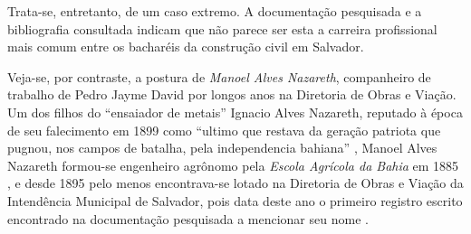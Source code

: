 Trata-se, entretanto, de um caso extremo. A documentação pesquisada e a bibliografia consultada indicam que não parece ser esta a carreira profissional mais comum entre os bacharéis da construção civil em Salvador.

Veja-se, por contraste, a postura de \textit{Manoel Alves Nazareth}, companheiro de trabalho de Pedro Jayme David por longos anos na Diretoria de Obras e Viação. Um dos filhos do ``ensaiador de metais'' Ignacio Alves Nazareth, reputado à época de seu falecimento em 1899 como ``ultimo que restava da geração patriota que pugnou, nos campos de batalha, pela independencia bahiana'' \cite{apontamentos_1899}, Manoel Alves Nazareth formou-se engenheiro agrônomo pela \textit{Escola Agrícola da Bahia} em 1885 \cite[p.~141]{araujo_agronomia_2010}, e desde 1895 pelo menos encontrava-se lotado na Diretoria de Obras e Viação da Intendência Municipal de Salvador, pois data deste ano o primeiro registro escrito encontrado na documentação pesquisada a mencionar seu nome \cite{salvador_relatorio_1895}. 

